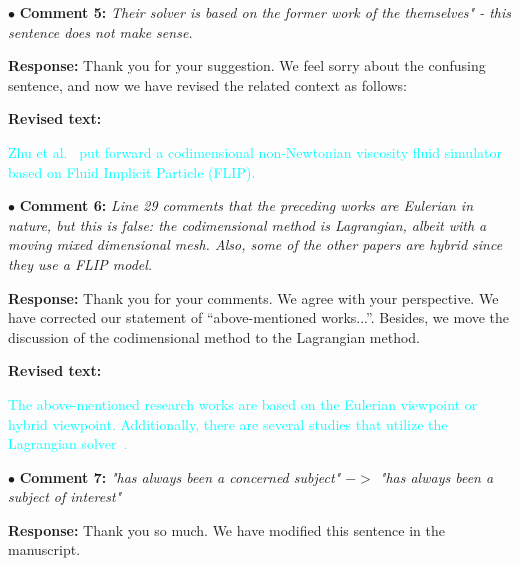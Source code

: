 \documentclass[12pt,a4paper]{article}
\newcommand{\revised}[1]{\textcolor{cyan}{#1}}
\begin{document}
\vspace{0.4cm}
\noindent$\bullet$ \enspace \textbf{Comment 5:}
\textit{Their solver is based on the former work of the themselves" - this sentence does not make sense. }

\vspace{0.2cm}
\textbf{Response:}
Thank you for your suggestion. We feel sorry about the confusing sentence, and now we have revised the related context as follows:

\vspace{0.4cm}
\textbf{Revised text:}

\revised{Zhu et al.~\cite{Zhu2015-nonNewton} put forward a codimensional non-Newtonian viscosity fluid simulator based on Fluid Implicit Particle (FLIP).}



\vspace{0.4cm}
\noindent$\bullet$ \enspace \textbf{Comment 6:}
\textit{Line 29 comments that the preceding works are Eulerian in nature, but this is false: the codimensional method is Lagrangian, albeit with a moving mixed dimensional mesh. Also, some of the other papers are hybrid since they use a FLIP model. }

\vspace{0.2cm}
\textbf{Response:}
Thank you for your comments. We agree with your perspective. We have corrected our statement of “above-mentioned works...”. Besides, we move the discussion of the codimensional method to the Lagrangian method.

\vspace{0.2cm}
\textbf{Revised text:}

\revised{
	\revised{The above-mentioned research works are based on the Eulerian viewpoint or hybrid viewpoint. Additionally, there are several studies that utilize the Lagrangian solver~\cite{Muller2004-elastic-plastic-melting,Solenthaler2007}.}
}


\vspace{0.4cm}
\noindent$\bullet$ \enspace \textbf{Comment 7:}
\textit{"has always been a concerned subject" $->$ "has always been a subject of interest" }

\vspace{0.2cm}
\textbf{Response:}
Thank you so much. We have modified this sentence in the manuscript.
\end{document}
